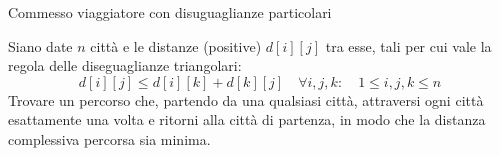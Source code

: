 \begin{frame}{Commesso viaggiatore con disuguaglianze particolari}

\vspace{-9pt}
\begin{myboxtitle}
Siano date $n$ città e le distanze (positive) $d[i][j]$ tra esse, \alert{tali per cui vale
la regola delle diseguaglianze triangolari:
\smallskip
\[
d[i][j] \le d[i][k] + d[k][j] \quad \forall i,j,k : \quad 1 \le i, j, k \le n
\]}
Trovare un percorso
che, partendo da una qualsiasi città, attraversi ogni città esattamente una
volta e ritorni alla città di partenza, in modo che la distanza complessiva
percorsa sia minima.
\end{myboxtitle}



\end{frame}


